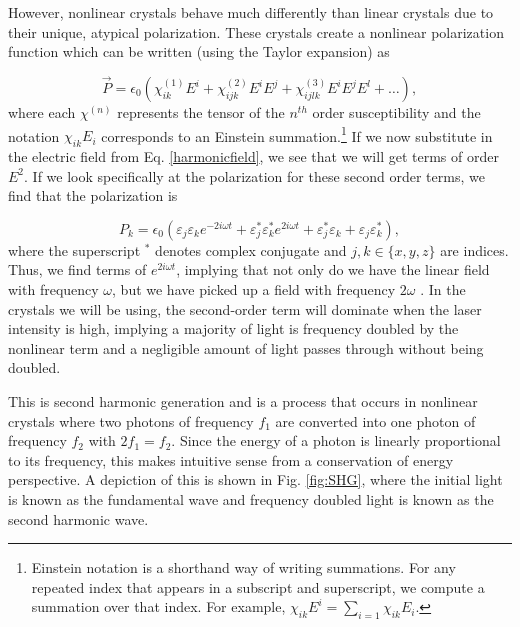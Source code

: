 However, nonlinear crystals behave much differently than linear crystals due to their unique, atypical polarization. These crystals create a nonlinear polarization function which can be written (using the Taylor expansion) as

\begin{equation}
  \vec P = \epsilon _0 \left( \chi^{(1)}_{ik}E^i + \chi^{(2)}_{ijk} E^i E^j + \chi^{(3)}_{ijlk}E^i E^j E^l +\dots \right),
  \label{nonlinearpolarization}
\end{equation}
%
where each $\chi^{(n)}$ represents the tensor of the $n^{th}$ order susceptibility and the notation $\chi_{ik} E_i$ corresponds to an Einstein summation.\footnote{Einstein notation is a shorthand way of writing summations. For any repeated index that appears in a subscript and superscript, we compute a summation over that index. For example, $\chi _{ik}E^i = \sum_{i=1} \chi_{ik}E_i$.} If we now substitute in the electric field from Eq. \ref{harmonicfield}, we see that we will get terms of order $E^2$. If we look specifically at the polarization for these second order terms, we find that the polarization is

\begin{equation}
  P_k = \epsilon_0 \left( \varepsilon_j \varepsilon_k e^{-2i\omega t} + \varepsilon_j^* \varepsilon_k^* e^{2i\omega t} + \varepsilon_j^* \varepsilon_k + \varepsilon_j \varepsilon_k^* \right),
  \label{freqdoubledfield}
\end{equation}
%
where the superscript $^*$ denotes complex conjugate and $j,k \in \{ x,y,z \}$ are indices. Thus, we find terms of $e^{2i\omega t}$, implying that not only do we have the linear field with frequency $\omega$, but we have picked up a field with frequency $2\omega$ \cite{Dood2006}. In the crystals we will be using, the second-order term will dominate when the laser intensity is high, implying a majority of light is frequency doubled by the nonlinear term and a negligible amount of light passes through without being doubled.


This is second harmonic generation and is a process that occurs in nonlinear crystals where two photons of frequency $f_1$ are converted into one photon of frequency $f_2$ with $2 f_1 =f_2$. Since the energy of a photon is linearly proportional to its frequency, this makes intuitive sense from a conservation of energy perspective. A depiction of this is shown in Fig. \ref{fig:SHG}, where the initial light is known as the fundamental wave and frequency doubled light is known as the second harmonic wave.

